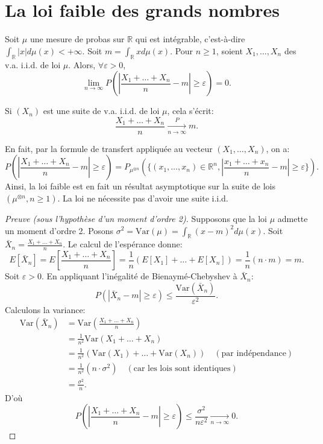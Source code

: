 \section{La loi faible des grands nombres}
\begin{theorem}
Soit $\mu$ une mesure de probas sur $\mathbb{R}$ qui est intégrable, c'est-à-dire $\int_{\mathbb{R}} |x| d\mu(x) < +\infty$.
Soit $m = \int_{\mathbb{R}} x d\mu(x)$.
Pour $n \ge 1$, soient $X_1, \dots, X_n$ des v.a. i.i.d. de loi $\mu$. Alors, $\forall \varepsilon > 0$,
\[
\lim_{n \to \infty} P\left(\left|\frac{X_1 + \dots + X_n}{n} - m\right| \ge \varepsilon\right) = 0.
\]
\end{theorem}
\begin{remark}
Si $(X_n)$ est une suite de v.a. i.i.d. de loi $\mu$, cela s'écrit:
\[
\frac{X_1 + \dots + X_n}{n} \xrightarrow[n\to\infty]{P} m.
\]
\end{remark}
\begin{remark}
En fait, par la formule de transfert appliquée au vecteur $(X_1, \dots, X_n)$, on a:
\[
P\left(\left|\frac{X_1+\dots+X_n}{n} - m\right| \ge \varepsilon\right) = P_{\mu^{\otimes n}}\left(\{(x_1, \dots, x_n) \in \mathbb{R}^n, \left|\frac{x_1+\dots+x_n}{n} - m\right| \ge \varepsilon\}\right).
\]
Ainsi, la loi faible est en fait un résultat asymptotique sur la suite de lois $(\mu^{\otimes n}, n \ge 1)$. La loi ne nécessite pas d'avoir une suite i.i.d.
\end{remark}
\begin{proof}[Preuve (sous l'hypothèse d'un moment d'ordre 2)]
Supposons que la loi $\mu$ admette un moment d'ordre 2. Posons $\sigma^2 = \text{Var}(\mu) = \int_{\mathbb{R}} (x-m)^2 d\mu(x)$.
Soit $\bar{X}_n = \frac{X_1 + \dots + X_n}{n}$.
Le calcul de l'espérance donne:
\[
E[\bar{X}_n] = E\left[\frac{X_1 + \dots + X_n}{n}\right] = \frac{1}{n}(E[X_1] + \dots + E[X_n]) = \frac{1}{n}(n \cdot m) = m.
\]
Soit $\varepsilon > 0$. En appliquant l'inégalité de Bienaymé-Chebyshev à $\bar{X}_n$:
\[
P(|\bar{X}_n - m| \ge \varepsilon) \le \frac{\text{Var}(\bar{X}_n)}{\varepsilon^2}.
\]
Calculons la variance:
\begin{align*}
\text{Var}(\bar{X}_n) &= \text{Var}\left(\frac{X_1 + \dots + X_n}{n}\right) \\
&= \frac{1}{n^2} \text{Var}(X_1 + \dots + X_n) \\
&= \frac{1}{n^2} (\text{Var}(X_1) + \dots + \text{Var}(X_n)) \quad (\text{par indépendance}) \\
&= \frac{1}{n^2} (n \cdot \sigma^2) \quad (\text{car les lois sont identiques}) \\
&= \frac{\sigma^2}{n}.
\end{align*}
D'où
\[
P\left(\left|\frac{X_1 + \dots + X_n}{n} - m\right| \ge \varepsilon\right) \le \frac{\sigma^2}{n\varepsilon^2} \xrightarrow[n\to\infty]{} 0.
\]
\end{proof}
